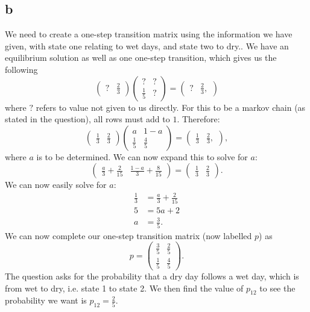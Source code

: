 \documentclass{article}
\begin{document}
\subsection{b}
We need to create a one-step transition matrix using the information we have given, with state one relating to wet days, and state two to dry.. We have an equilibrium solution as well as one one-step transition, which gives us the following
\begin{equation}
    \begin{pmatrix}
        ? & \frac{2}{3}
    \end{pmatrix}\begin{pmatrix}
        ? & ? \\ \frac{1}{5} & ? 
    \end{pmatrix} = 
    \begin{pmatrix}
        ? & \frac{2}{3},
    \end{pmatrix}
\end{equation}
where $?$ refers to value not given to us directly. For this to be a markov chain (as stated in the question), all rows must add to $1$. Therefore:
\begin{equation}
    \begin{pmatrix}
        \frac{1}{3} & \frac{2}{3}
    \end{pmatrix}\begin{pmatrix}
        a & 1-a \\ \frac{1}{5} & \frac{4}{5} 
    \end{pmatrix} = 
    \begin{pmatrix}
        \frac{1}{3} & \frac{2}{3},
    \end{pmatrix},    
\end{equation}
where $a$ is to be determined. We can now expand this to solve for $a$:
\begin{equation}
    \begin{pmatrix}
        \frac{a}{3} + \frac{2}{15} & \frac{1-a}{3} + \frac{8}{15} \end{pmatrix} = \begin{pmatrix}
            \frac{1}{3} & \frac{2}{3}
        \end{pmatrix}.
\end{equation}
We can now easily solve for $a$:
\begin{align}
    \frac{1}{3} &= \frac{a}{3} + \frac{2}{15}\\
    5 &= 5a+2\\
    a &= \frac{3}{5}.
\end{align}
We can now complete our one-step transition matrix (now labelled $p$) as
\begin{equation}
    p = \begin{pmatrix}
        \frac{3}{5} & \frac{2}{5} \\ \frac{1}{5} & \frac{4}{5} 
    \end{pmatrix}.
\end{equation}
The question asks for the probability that a dry day follows a wet day, which is from wet to dry, i.e. state 1 to state 2. We then find the value of $p_{12}$ to see the probability we want is $p_{12} = \frac{2}{5}$.
\end{document}
